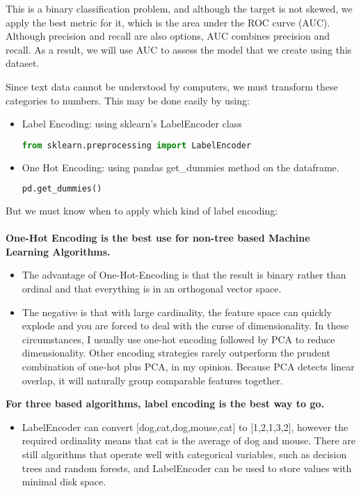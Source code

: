This is a binary classification problem, and although the target is not skewed, we apply the best metric for it, which is the area under the ROC curve (AUC). Although precision and recall are also options, AUC combines precision and recall. As a result, we will use AUC to assess the model that we create using this dataset.

Since text data cannot be understood by computers, we must transform these categories to numbers. This may be done easily by using:

\begin{itemize}
	\item{Label Encoding: using sklearn's LabelEncoder class}
	\begin{lstlisting}[language=Python, caption=Label Encoder, numbers=none]
	from sklearn.preprocessing import LabelEncoder\end{lstlisting}
	\item{One Hot Encoding: using pandas get\_dummies method on the dataframe.}
	\begin{lstlisting}[language=Python, caption=Get dummies, numbers=none]
	pd.get_dummies()\end{lstlisting}
\end{itemize}
But we must know when to apply which kind of label encoding: \\
\\
\noindent
\textbf{One-Hot Encoding is the best use for non-tree based Machine Learning Algorithms.}
\begin{itemize}
	\item The advantage of One-Hot-Encoding is that the result is binary rather than ordinal and that everything is in an orthogonal vector space.
	\item The negative is that with large cardinality, the feature space can quickly explode and you are forced to deal with the curse of dimensionality. In these circumstances, I usually use one-hot encoding followed by PCA to reduce dimensionality. Other encoding strategies rarely outperform the prudent combination of one-hot plus PCA, in my opinion. Because PCA detects linear overlap, it will naturally group comparable features together.
\end{itemize}

\noindent
\textbf{For three based algorithms, label encoding is the best way to go.}

\begin{itemize}
	\item{LabelEncoder can convert [dog,cat,dog,mouse,cat] to [1,2,1,3,2], however the required ordinality means that cat is the average of dog and mouse. There are still algorithms that operate well with categorical variables, such as decision trees and random forests, and LabelEncoder can be used to store values with minimal disk space.}
\end{itemize}

